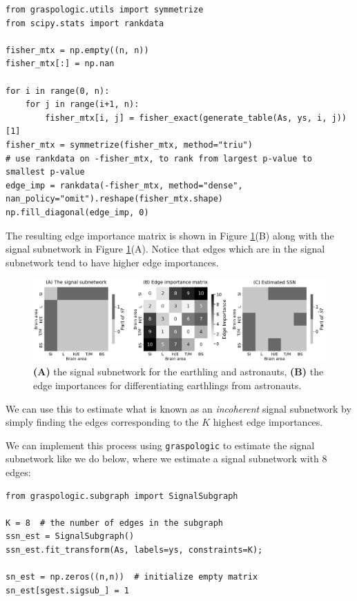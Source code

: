 \begin{lstlisting}[style=python]
from graspologic.utils import symmetrize
from scipy.stats import rankdata

fisher_mtx = np.empty((n, n))
fisher_mtx[:] = np.nan

for i in range(0, n):
    for j in range(i+1, n):
        fisher_mtx[i, j] = fisher_exact(generate_table(As, ys, i, j))[1]
fisher_mtx = symmetrize(fisher_mtx, method="triu")
# use rankdata on -fisher_mtx, to rank from largest p-value to smallest p-value
edge_imp = rankdata(-fisher_mtx, method="dense", nan_policy="omit").reshape(fisher_mtx.shape)
np.fill_diagonal(edge_imp, 0)
\end{lstlisting}

The resulting edge importance matrix is shown in Figure \ref{fig:ch9:ssn:ssn_inco_edgeimp}(B) along with the signal subnetwork in Figure \ref{fig:ch9:ssn:ssn_inco_edgeimp}(A). Notice that edges which are in the signal subnetwork tend to have higher edge importances.

\begin{figure}[h]
    \centering
    \includegraphics[width=\linewidth]{applications/ch9/Images/ssn_inco_edgeimp.png}
    \caption[Edge importances for incoherent signal subnetworks]{\textbf{(A)} the signal subnetwork for the earthling and astronauts, \textbf{(B)} the edge importances for differentiating earthlings from astronauts.}
    \label{fig:ch9:ssn:ssn_inco_edgeimp}
\end{figure}

We can use this to estimate what is known as an \textit{incoherent} signal subnetwork by simply finding the edges corresponding to the $K$ highest edge importances.

We can implement this process using \texttt{graspologic} to estimate the signal subnetwork like we do below, where we estimate a signal subnetwork with $8$ edges:

\begin{lstlisting}[style=python]
from graspologic.subgraph import SignalSubgraph

K = 8  # the number of edges in the subgraph
ssn_est = SignalSubgraph()
ssn_est.fit_transform(As, labels=ys, constraints=K);

sn_est = np.zeros((n,n))  # initialize empty matrix
sn_est[sgest.sigsub_] = 1
\end{lstlisting}

